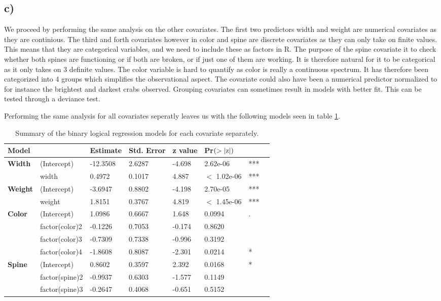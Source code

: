 \documentclass[a4paper, 10pt, reqno]{amsart}
\begin{document}
\subsection{c)}
We proceed by performing the same analysis on the other covariates. The first two predictors width and weight are numerical covariates as they are continious. The third and forth covariates however in color and spine are discrete covariates as they can only take on finite values. This means that they are categorical variables, and we need to include these as factors in R. The purpose of the spine covariate it to check whether both spines are functioning or if both are broken, or if just one of them are working. It is therefore natural for it to be categorical as it only takes on 3 definite values. The color variable is hard to quantify as color is really a continuous spectrum. It has therefore been categorized into 4 groups which simplifies the observational aspect. The covariate could also have been a numerical predictor normalized to for instance the brightest and darkest crabs observed. Grouping covariates can sometimes result in models with better fit. This can be tested through a deviance test. 

Performing the same analysis for all covariates seperatly leaves us with the following models seen in table \ref{tab: 2}. 

\begin{table}
\caption{Summary of the binary logical regression models for each covariate separately.}
\label{tab: 2}
\begin{tabular}{llllllll}
\hline\hline
Model & & Estimate  & Std. Error & z value & Pr$(>\abs{\mathrm{z}})$ & \\ \hline

\textbf{Width}&(Intercept) & -12.3508 & 2.6287   & -4.698  & 2.62e-06 & ***\\
&width   & 0.4972 & 0.1017   & 4.887  & $<$ 1.02e-06 & ***\\
\hline

\textbf{Weight} &(Intercept) & -3.6947 & 0.8802   & -4.198  & 2.70e-05 & ***\\
&weight   & 1.8151 & 0.3767   & 4.819  & $<$ 1.45e-06 & ***\\ \hline

\textbf{Color}    &    (Intercept)    &  1.0986  &   0.6667   &1.648 &  0.0994 &.\\
&factor(color)2 & -0.1226 &    0.7053 & -0.174 &  0.8620  &\\
&factor(color)3 & -0.7309 &    0.7338 & -0.996  & 0.3192  &\\
&factor(color)4  &-1.8608  &   0.8087&  -2.301 &  0.0214 &*\\ \hline

\textbf{Spine}& (Intercept)   &   0.8602  &   0.3597 & 2.392  & 0.0168 &* \\
&factor(spine)2 & -0.9937  &   0.6303 & -1.577&   0.1149  &\\
&factor(spine)3 & -0.2647  &   0.4068 & -0.651 &  0.5152 &\\
\hline
\end{tabular}
\end{table}
\end{document}
